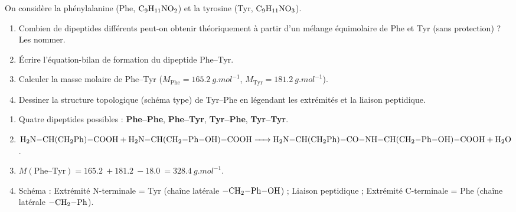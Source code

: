 \documentclass[11pt]{article}
\begin{document}
\begin{exercice}
On considère la phénylalanine (Phe, $\ce{C9H11NO2}$) et la tyrosine (Tyr, $\ce{C9H11NO3}$).
\begin{enumerate}
    \item Combien de dipeptides différents peut-on obtenir théoriquement à partir d'un mélange équimolaire de Phe et Tyr (sans protection) ? Les nommer.
    \item Écrire l'équation-bilan de formation du dipeptide Phe–Tyr.
    \item Calculer la masse molaire de Phe–Tyr ($M_{\text{Phe}}=\SI{165,2}{g.mol^{-1}}$, $M_{\text{Tyr}}=\SI{181,2}{g.mol^{-1}}$).
    \item Dessiner la structure topologique (schéma type) de Tyr–Phe en légendant les extrémités et la liaison peptidique.
\end{enumerate}
\end{exercice}

\begin{corrige}
\begin{enumerate}
    \item Quatre dipeptides possibles : \textbf{Phe–Phe}, \textbf{Phe–Tyr}, \textbf{Tyr–Phe}, \textbf{Tyr–Tyr}.
    \item $\ce{H2N-CH(CH2Ph)-COOH + H2N-CH(CH2-Ph-OH)-COOH -> H2N-CH(CH2Ph)-CO-NH-CH(CH2-Ph-OH)-COOH + H2O}$.
    \item $M(\text{Phe–Tyr}) = \SI{165,2}{} + \SI{181,2}{} - \SI{18,0}{} = \SI{328,4}{g.mol^{-1}}$.
    \item Schéma : Extrémité N-terminale = Tyr (chaîne latérale $\ce{-CH2-Ph-OH}$) ; Liaison peptidique  ; Extrémité C-terminale = Phe (chaîne latérale $\ce{-CH2-Ph}$).
    \begin{center}
    \end{center}
\end{enumerate}
\end{corrige}
\end{document}
